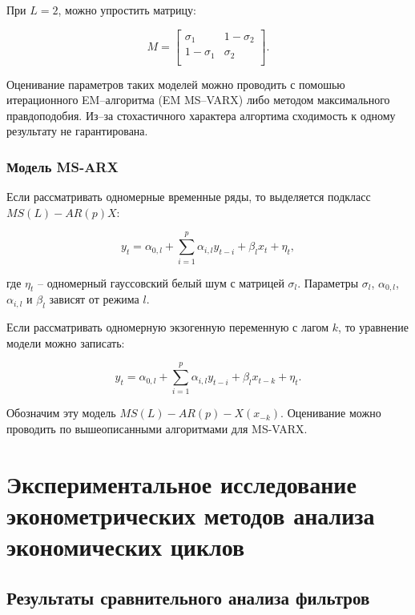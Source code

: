 \documentclass[a4paper,14pt]{extreport}
\begin{document}
	При $L=2$, можно упростить матрицу:
	
	\begin{equation}
	M=
	\left[ {\begin{array}{cc}
		\sigma_{1} & 1-\sigma_{2} \\
		1-\sigma_{1} & \sigma_{2} \\
		\end{array} } \right].
	\label{eq:M_simplified}
	\end{equation}
	
	Оценивание параметров таких моделей можно проводить с помошью итерационного EM--алгоритма (EM MS--VARX) \cite{malNovopMSVARX} либо методом максимального правдоподобия. Из--за стохастичного характера алгортима сходимость к одному результату не гарантирована.
	
	
	\subsection{Модель MS-ARX}
	
	Если рассматривать одномерные временные ряды, то выделяется подкласс $MS(L)-AR(p)X$:
	
	\begin{equation}  
	y_{t} = \alpha_{0,l} + \sum_{i=1}^{p} \alpha_{i,l} y_{t-i} + \beta_{l} x_{t} + \eta_{t},
	\label{eq:msarx_base}
	\end{equation}
	
	где $\eta_{t}$ -- одномерный гауссовский белый шум с матрицей $\sigma_{l}$. Параметры $\sigma_{l}$, $\alpha_{0,l}$, $\alpha_{i,l}$ и $\beta_{l}$ зависят от режима $l$.
	
	Если рассматривать одномерную экзогенную переменную с лагом $k$, то уравнение модели можно записать:
	
	\begin{equation}  
	y_{t} = \alpha_{0,l} + \sum_{i=1}^{p} \alpha_{i,l} y_{t-i} + \beta_{l} x_{t-k} + \eta_{t}.
	\label{eq:gen-msarx}
	\end{equation}
	
	Обозначим эту модель $MS(L)-AR(p)-X({x}_{-k})$. Оценивание можно проводить по вышеописанными алгоритмами для MS-VARX.
	
	
	\chapter{Экспериментальное исследование эконометрических методов анализа экономических циклов}
	
	\section{Результаты сравнительного анализа фильтров}
	
\end{document}
